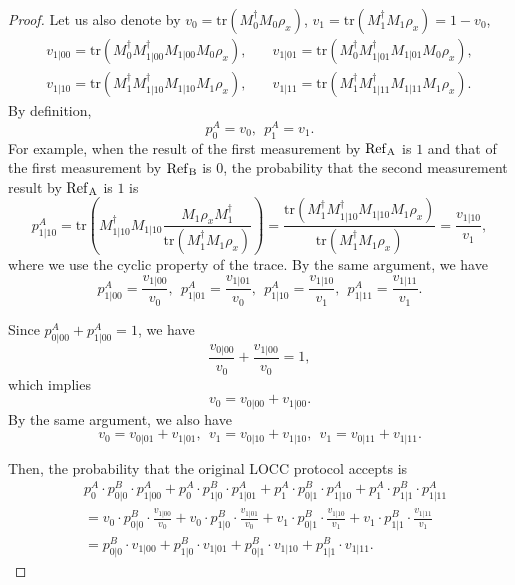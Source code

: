 \begin{proof}
    Let us also denote by $v_0 = \mathrm{tr}(M_0^\dagger M_0 \rho_x)$, $v_1 = \mathrm{tr}(M_1^\dagger M_1 \rho_x) = 1 - v_0$,
    \begin{align*}
    v_{1|00}=\mathrm{tr}(M^{ \dagger}_0 M_{1|00}^{\dagger} M_{1|00} M_0 \rho_x), \quad &  v_{1|01}=\mathrm{tr}(M_0^\dagger M_{1|01}^{\dagger} M_{1|01} M_0 \rho_x), \\
    v_{1|10}=\mathrm{tr}(M^{\dagger}_1 M_{1|10}^{\dagger} M_{1|10} M_1 \rho_x), \quad & v_{1|11}=\mathrm{tr}(M^{\dagger}_1 M_{1|11}^{\dagger} M_{1|11} M_1 \rho_x).
    \end{align*}
    By definition,
    \[
        p^A_0 = v_0,\ \ p^A_1 = v_1.
    \]
    For example, when the result of the first measurement by $\rm{Ref}_A$ is $1$ and that of the first measurement by $\rm{Ref}_B$ is $0$, the probability that the second measurement result by $\rm{Ref}_A$ is $1$ is 
    \begin{equation}\label{eq:fraction}
        p^A_{1|10} = \mathrm{tr}(M_{1|10}^\dagger M_{1|10} \frac{M_1 \rho_x M^\dagger_1}{\mathrm{tr}(M^\dagger_1 M_1 \rho_x)}) = \frac{\mathrm{tr}(M^\dagger_1 M_{1|10}^\dagger M_{1|10} M_1 \rho_x) }{\mathrm{tr}(M^\dagger_1 M_1 \rho_x)} = \frac{v_{1|10}}{v_1},
    \end{equation}
    where we use the cyclic property of the trace. By the same argument, we have 
     \begin{equation}
         p^A_{1|00} = \frac{v_{1|00}}{v_0},\ \ p^A_{1|01} = \frac{v_{1|01}}{v_0},\ \ p^A_{1|10} = \frac{v_{1|10}}{v_1},\ \ p^A_{1|11} = \frac{v_{1|11}}{v_1}.
     \end{equation}
    
    Since $ p^A_{0|00} +  p^A_{1|00} = 1$, we have
    \[
        \frac{v_{0|00}}{v_0} + \frac{v_{1|00}}{v_0} = 1,
    \]
    which implies 
    \[
         v_0 = v_{0|00} + v_{1|00}.
    \]
    By the same argument, we also have
    \[
         v_0 = v_{0|01} + v_{1|01},\ \ v_1 = v_{0|10} + v_{1|10},\ \ v_1 = v_{0|11} + v_{1|11}.
    \]
    
    Then, the probability that the original LOCC protocol accepts is
    \begin{align*}
        & p^A_{0} \cdot p_{0|0}^B \cdot p^A_{1|00} + p^A_{0} \cdot p_{1|0}^B \cdot p^A_{1|01} + p^A_{1} \cdot p_{0|1}^B \cdot p^A_{1|10} + p^A_{1} \cdot p_{1|1}^B \cdot p^A_{1|11} \\
        &= v_{0} \cdot p_{0|0}^B \cdot \frac{v_{1|00}}{v_0} + v_{0} \cdot p_{1|0}^B \cdot \frac{v_{1|01}}{v_0} + v_{1} \cdot p_{0|1}^B \cdot \frac{v_{1|10}}{v_1} +  v_{1} \cdot p_{1|1}^B \cdot \frac{v_{1|11}}{v_1}\\
        &= p_{0|0}^B \cdot v_{1|00} + p_{1|0}^B \cdot v_{1|01} + p_{0|1}^B \cdot v_{1|10} + p_{1|1}^B \cdot v_{1|11}.
    \end{align*}
    

\end{proof}
